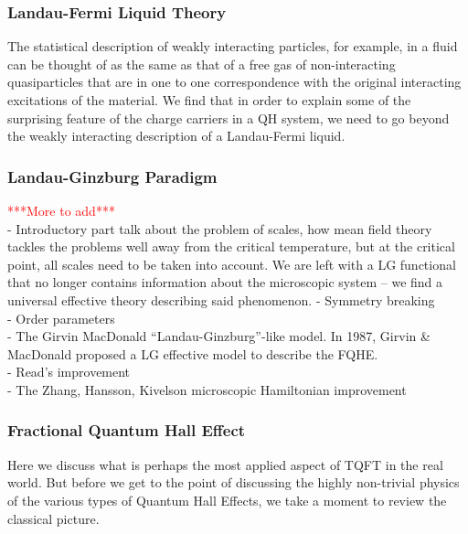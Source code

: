         \subsubsection{Landau-Fermi Liquid Theory} \label{Fermi_Liquid_sec}
        The statistical description of weakly interacting particles, for example, in a fluid can be thought of as the same as that of a free gas of non-interacting quasiparticles that are in one to one correspondence with the original interacting excitations of the material. We find that in order to explain some of the surprising feature of the charge carriers in a QH system, we need to go beyond the weakly interacting description of a Landau-Fermi liquid.
        \subsubsection{Landau-Ginzburg Paradigm} \label{Landau-Ginzburg_sec}
        \textcolor{red}{***More to add***} \\
        - Introductory part talk about the problem of scales, how mean field theory tackles the problems well away from the critical temperature, but at the critical point, all scales need to be taken into account. We are left with a LG functional that no longer contains information about the microscopic system -- we find a universal effective theory describing said phenomenon.
        - Symmetry breaking \\
        - Order parameters\\
        - The Girvin MacDonald ``Landau-Ginzburg''-like model. \cite{Girvin1987} In 1987, Girvin \& MacDonald proposed a LG effective model to describe the FQHE. \\
        - Read's improvement \cite{Read1989}\\
        - The Zhang, Hansson, Kivelson microscopic Hamiltonian improvement \cite{PhysRevLett.62.82}
        \subsubsection{Fractional Quantum Hall Effect} \label{FQHE_sec}
        Here we discuss what is perhaps the most applied aspect of TQFT in the real world. But before we get to the point of discussing the highly non-trivial physics of the various types of Quantum Hall Effects, we take a moment to review the classical picture.
